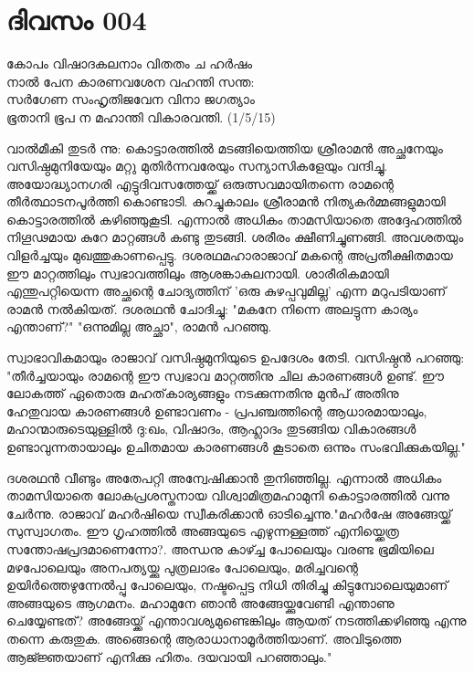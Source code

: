 \newpage
\section{ദിവസം 004}

\begin{center}
കോപം വിഷാദകലനാം വിതതം ച ഹർഷം\\
നാൽ പേന കാരണവശേന വഹന്തി സന്ത:\\
സർഗേണ സംഹൃതിജവേന വിനാ ജഗത്യാം \\
ഭൂതാനി ഭൂപ ന മഹാന്തി വികാരവന്തി. (1/5/15)\\
\end{center}

വാല്‍മീകി തുടര്‍ ന്നു: കൊട്ടാരത്തില്‍ മടങ്ങിയെത്തിയ ശ്രീരാമന്‍ അച്ഛനേയും വസിഷ്ഠമുനിയേയും മറ്റു മുതിര്‍ന്നവരേയും സന്യാസികളേയും വന്ദിച്ചു. അയോദ്ധ്യാനഗരി എട്ടുദിവസത്തേയ്ക്ക്‌ ഒരുത്സവമായിതന്നെ രാമന്റെ തീര്‍ത്ഥാടനപൂര്‍ത്തി കൊണ്ടാടി. കുറച്ചുകാലം ശ്രീരാമന്‍ നിത്യകര്‍മ്മങ്ങളുമായി കൊട്ടാരത്തില്‍ കഴിഞ്ഞുകൂടി. എന്നാല്‍ അധികം താമസിയാതെ അദ്ദേഹത്തില്‍ നിഗൂഢമായ കുറേ മാറ്റങ്ങള്‍ കണ്ടു തുടങ്ങി. ശരീരം ക്ഷീണിച്ചുണങ്ങി. അവശതയും വിളര്‍ച്ചയും മുഖത്തുകാണപ്പെട്ടു. ദശരഥമഹാരാജാവ്‌ മകന്റെ അപ്രതീക്ഷിതമായ ഈ മാറ്റത്തിലും സ്വഭാവത്തിലും ആശങ്കാകുലനായി. ശാരീരികമായി എന്തുപറ്റിയെന്ന അച്ഛന്റെ ചോദ്യത്തിന്‌ 'ഒരു കുഴപ്പവുമില്ല' എന്ന മറുപടിയാണ്‌ രാമന്‍ നല്‍കിയത്‌. ദശരഥന്‍ ചോദിച്ചു: "മകനേ നിന്നെ അലട്ടുന്ന കാര്യം എന്താണ്‌?" "ഒന്നുമില്ല അച്ഛാ", രാമന്‍ പറഞ്ഞു. 


സ്വാഭാവികമായും രാജാവ്‌ വസിഷ്ഠമുനിയുടെ ഉപദേശം തേടി. വസിഷ്ഠന്‍ പറഞ്ഞു: "തീര്‍ച്ചയായും രാമന്റെ ഈ സ്വഭാവ മാറ്റത്തിനു ചില കാരണങ്ങള്‍ ഉണ്ട്‌. ഈ ലോകത്ത്‌ ഏതൊരു മഹത്‌കാര്യങ്ങളും നടക്കുന്നതിനു മുന്‍പ്‌ അതിനു ഹേതുവായ കാരണങ്ങള്‍ ഉണ്ടാവണം - പ്രപഞ്ചത്തിന്റെ ആധാരമായാലും, മഹാന്മാരുടെയുള്ളില്‍ ദു:ഖം, വിഷാദം, ആഹ്ലാദം തുടങ്ങിയ വികാരങ്ങള്‍ ഉണ്ടാവുന്നതായാലും ഉചിതമായ കാരണങ്ങള്‍ കൂടാതെ ഒന്നും സംഭവിക്കുകയില്ല."

ദശരഥന്‍ വീണ്ടും അതേപറ്റി അന്വേഷിക്കാന്‍ തുനിഞ്ഞില്ല. എന്നാല്‍ അധികം താമസിയാതെ ലോകപ്രശസ്തനായ വിശ്വാമിത്രമഹാമുനി കൊട്ടാരത്തില്‍ വന്നു ചേര്‍ന്നു. രാജാവ്‌ മഹര്‍ഷിയെ സ്വീകരിക്കാന്‍ ഓടിച്ചെന്നു."മഹര്‍ഷേ അങ്ങേയ്ക്ക്‌ സുസ്വാഗതം. ഈ ഗൃഹത്തില്‍ അങ്ങയുടെ എഴുന്നള്ളത്ത്‌ എനിയ്ക്കെത്ര സന്തോഷപ്രദമാണെന്നോ?. അന്ധനു കാഴ്ച്ച പോലെയും വരണ്ട ഭൂമിയിലെ മഴപോലെയും അനപത്യയ്ക്കു പുത്രലാഭം പോലെയും, മരിച്ചവന്റെ ഉയിര്‍ത്തെഴുന്നേല്‍പ്പു പോലെയും, നഷ്ടപ്പെട്ട നിധി തിരിച്ചു കിട്ടുമ്പോലെയുമാണ്‌ അങ്ങയുടെ ആഗമനം. മഹാമുനേ ഞാന്‍ അങ്ങേയ്ക്കുവേണ്ടി എന്താണു ചെയ്യേണ്ടത്‌? അങ്ങേയ്ക്ക്‌ എന്താവശ്യമുണ്ടെങ്കിലും ആയത്‌ നടത്തിക്കഴിഞ്ഞു എന്നു തന്നെ കരുതുക. അങ്ങെന്റെ ആരാധാനാമൂര്‍ത്തിയാണ്‌. അവിടുത്തെ ആജ്ജ്ഞയാണ്‌ എനിക്കു ഹിതം. ദയവായി പറഞ്ഞാലും."
